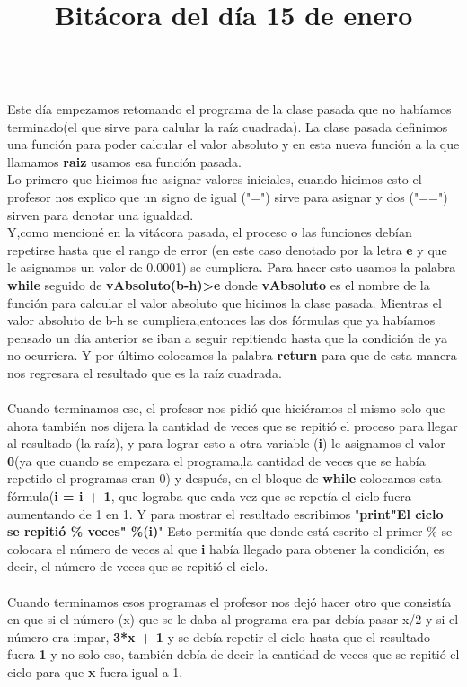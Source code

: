 \documentclass{article}
\begin{document}
	\title{\huge\textbf{Bitácora del día 15 de enero\\}} \\
	Este día empezamos retomando el programa de la clase pasada que no habíamos terminado(el que sirve para calular la raíz cuadrada). La clase pasada definimos una función para poder calcular el valor absoluto y en esta nueva función a la que llamamos \textbf{raiz} usamos esa función pasada. \\
	Lo primero que hicimos fue asignar valores iniciales, cuando hicimos esto el profesor nos explico que un signo de igual ("=") sirve para asignar y dos ("==") sirven para denotar una igualdad. \\
	Y,como mencioné en la vitácora pasada, el proceso o las funciones debían repetirse hasta que el rango de error (en este caso denotado por la letra \textbf{e} y que le asignamos un valor de 0.0001) se cumpliera. Para hacer esto usamos la palabra \textbf{while} seguido de \textbf{vAbsoluto(b-h)>e} donde \textbf{vAbsoluto} es el nombre de la función para calcular el valor absoluto que hicimos la clase pasada. Mientras el valor absoluto de b-h se cumpliera,entonces las dos fórmulas que ya habíamos pensado un día anterior se iban a seguir repitiendo hasta que la condición de ya no ocurriera. Y por último colocamos la palabra \textbf{return} para que de esta manera nos regresara el resultado que es la raíz cuadrada. \\ \\
	Cuando terminamos ese, el profesor nos pidió que hiciéramos el mismo solo que ahora también nos dijera la cantidad de veces que se repitió el proceso para llegar al resultado (la raíz), y para lograr esto a otra variable (\textbf{i}) le asignamos el valor \textbf{0}(ya que cuando se empezara el programa,la cantidad de veces que se había repetido el programas eran 0) y después, en el bloque de \textbf{while} colocamos esta fórmula(\textbf{i = i + 1}, que lograba que cada vez que se repetía el ciclo fuera aumentando de 1 en 1. Y para mostrar el resultado escribimos "\textbf{print"El ciclo se repitió \% veces" \%(i)}" Esto permitía que donde está escrito el primer \% se colocara el número de veces al que \textbf{i} había llegado para obtener la condición, es decir, el número de veces que se repitió el ciclo. \\ \\
	Cuando terminamos esos programas el profesor nos dejó hacer otro que consistía en que si el número (x) que se le daba al programa era par debía pasar x/2 y si el número era impar, \textbf{3*x + 1} y se debía repetir el ciclo hasta que el resultado fuera \textbf{1} y no solo eso, también debía de decir la cantidad de veces que se repitió el ciclo para que \textbf{x} fuera igual a 1. \\
\end{document}
